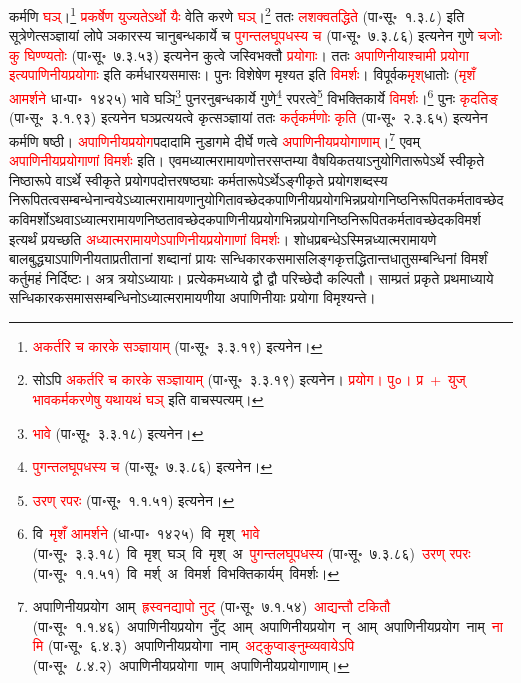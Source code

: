 \begin{sloppypar}
कर्मणि \textcolor{red}{घञ्‌}।\footnote{\textcolor{red}{अकर्तरि च कारके सञ्ज्ञायाम्} (पा॰सू॰~३.३.१९) इत्यनेन।} \textcolor{red}{प्रकर्षेण युज्यतेऽर्थो यैः} वेति करणे \textcolor{red}{घञ्‌}।\footnote{सोऽपि \textcolor{red}{अकर्तरि च कारके सञ्ज्ञायाम्} (पा॰सू॰~३.३.१९) इत्यनेन। \textcolor{red}{प्रयोग। पु०। प्र~{\englishfont +}~युज् भावकर्मकरणेषु यथायथं घञ्‌} इति वाचस्पत्यम्।} ततः \textcolor{red}{लशक्वतद्धिते} (पा॰सू॰~१.३.८) इति सूत्रेणेत्सञ्ज्ञायां लोपे ञकारस्य चानुबन्धकार्ये च \textcolor{red}{पुगन्तलघूपधस्य च} (पा॰सू॰~७.३.८६) इत्यनेन गुणे \textcolor{red}{चजोः कु घिण्ण्यतोः} (पा॰सू॰~७.३.५३) इत्यनेन कुत्वे जस्विभक्तौ \textcolor{red}{प्रयोगाः}। ततः \textcolor{red}{अपाणिनीयाश्चामी प्रयोगा इत्यपाणिनीयप्रयोगाः} इति कर्मधारय\-समासः। पुनः विशेषेण मृश्यत इति \textcolor{red}{विमर्शः}। वि\-पूर्वक\-\textcolor{red}{मृश्‌}\-धातोः (\textcolor{red}{मृशँ आमर्शने} धा॰पा॰~१४२५) भावे घञि\footnote{\textcolor{red}{भावे} (पा॰सू॰~३.३.१८) इत्यनेन।} पुनरनुबन्ध\-कार्ये गुणे\footnote{\textcolor{red}{पुगन्त\-लघूपधस्य च} (पा॰सू॰~७.३.८६) इत्यनेन।} रपरत्वे\footnote{\textcolor{red}{उरण् रपरः} (पा॰सू॰~१.१.५१) इत्यनेन।} विभक्ति\-कार्ये \textcolor{red}{विमर्शः}।\footnote{वि~\textcolor{red}{मृशँ आमर्शने} (धा॰पा॰~१४२५)~\arrow वि~मृश्~\arrow \textcolor{red}{भावे} (पा॰सू॰~३.३.१८)~\arrow वि~मृश्~घञ्~\arrow वि~मृश्~अ~\arrow \textcolor{red}{पुगन्त\-लघूपधस्य} (पा॰सू॰~७.३.८६)~\arrow \textcolor{red}{उरण् रपरः} (पा॰सू॰~१.१.५१)~\arrow वि~मर्श्~अ~\arrow विमर्श~\arrow विभक्तिकार्यम्~\arrow विमर्शः।} पुनः \textcolor{red}{कृदतिङ्‌} (पा॰सू॰~३.१.९३) इत्यनेन घञ्प्रत्ययत्वे कृत्सञ्ज्ञायां ततः \textcolor{red}{कर्तृ\-कर्मणोः कृति} (पा॰सू॰~२.३.६५) इत्यनेन कर्मणि षष्ठी। \textcolor{red}{अपाणिनीय\-प्रयोग}\-पदादामि नुडागमे दीर्घे णत्वे \textcolor{red}{अपाणिनीय\-प्रयोगाणाम्‌}।\footnote{अपाणिनीय\-प्रयोग~आम्~\arrow \textcolor{red}{ह्रस्वनद्यापो नुट्‌} (पा॰सू॰~७.१.५४)~\arrow \textcolor{red}{आद्यन्तौ टकितौ} (पा॰सू॰~१.१.४६)~\arrow अपाणिनीय\-प्रयोग~नुँट्~आम्~\arrow अपाणिनीय\-प्रयोग~न्~आम्~\arrow अपाणिनीय\-प्रयोग~नाम्~\arrow \textcolor{red}{नामि} (पा॰सू॰~६.४.३)~\arrow अपाणिनीय\-प्रयोगा~नाम्~\arrow \textcolor{red}{अट्कुप्वाङ्नुम्व्यवायेऽपि} (पा॰सू॰~८.४.२)~\arrow अपाणिनीय\-प्रयोगा~णाम्~\arrow अपाणिनीय\-प्रयोगाणाम्।} एवम् \textcolor{red}{अपाणिनीय\-प्रयोगाणां विमर्शः} इति। एवमध्यात्म\-रामायणोत्तर\-सप्तम्या वैषयिकतयाऽनुयोगिता\-रूपेऽर्थे स्वीकृते निष्ठा\-रूपे वाऽर्थे स्वीकृते प्रयोग\-पदोत्तर\-षष्ठ्याः कर्मता\-रूपेऽर्थेऽङ्गीकृते प्रयोग\-शब्दस्य निरूपितत्व\-सम्बन्धेनान्वयेऽध्यात्म\-रामायणानुयोगितावच्छेदक\-पाणिनीय\-प्रयोग\-भिन्न\-प्रयोग\-निष्ठ\-निरूपित\-कर्मतावच्छेदक\-विमर्शोऽथवाऽध्यात्म\-रामायण\-निष्ठतावच्छेदक\-पाणिनीय\-प्रयोग\-भिन्न\-प्रयोग\-निष्ठ\-निरूपित\-कर्मतावच्छेदक\-विमर्श इत्यर्थं प्रयच्छति \textcolor{red}{अध्यात्म\-रामायणेऽपाणिनीय\-प्रयोगाणां विमर्शः}। शोध\-प्रबन्धेऽस्मिन्नध्यात्म\-रामायणे बाल\-बुद्ध्याऽपाणिनीयताप्रतीतानां शब्दानां प्रायः सन्धि\-कारक\-समास\-लिङ्ग\-कृत्तद्धितान्त\-धातु\-सम्बन्धिनां विमर्शं कर्तुमहं निर्दिष्टः। अत्र त्रयोऽध्यायाः। प्रत्येकमध्याये द्वौ द्वौ परिच्छेदौ कल्पितौ। साम्प्रतं प्रकृते प्रथमाध्याये सन्धि\-कारक\-समास\-सम्बन्धिनोऽध्यात्म\-रामायणीया अपाणिनीयाः प्रयोगा विमृश्यन्ते।\end{sloppypar}
